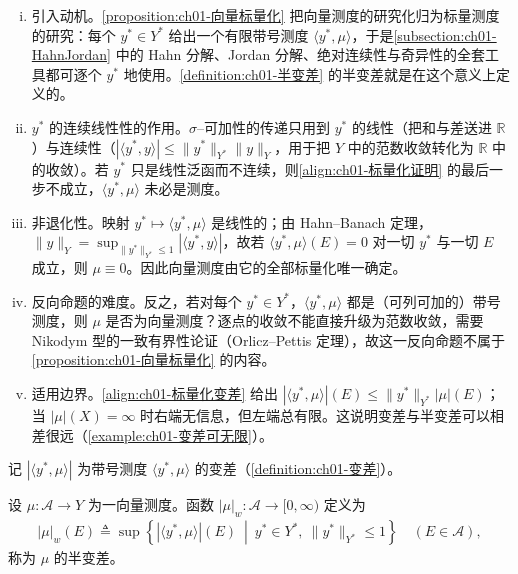\documentclass[../../main.tex]{subfiles}%
\begin{document}
\begin{remark}\label{remark:ch01-向量标量化注}
\begin{enumerate}[(i)]
\item 引入动机。\cref{proposition:ch01-向量标量化} 把向量测度的研究化归为标量测度的研究：每个 $y^*\in Y^*$ 给出一个有限带号测度 $\langle y^*,\mu\rangle$，于是\cref{subsection:ch01-HahnJordan} 中的 Hahn 分解、Jordan 分解、绝对连续性与奇异性的全套工具都可逐个 $y^*$ 地使用。\cref{definition:ch01-半变差} 的半变差就是在这个意义上定义的。
\item $y^*$ 的连续线性性的作用。$\sigma$--可加性的传递只用到 $y^*$ 的线性（把和与差送进 $\mathbb{R}$）与连续性（$\left|\langle y^*,y\rangle\right|\leqslant\|y^*\|_{Y^*}\|y\|_Y$，用于把 $Y$ 中的范数收敛转化为 $\mathbb{R}$ 中的收敛）。若 $y^*$ 只是线性泛函而不连续，则\eqref{align:ch01-标量化证明} 的最后一步不成立，$\langle y^*,\mu\rangle$ 未必是测度。
\item 非退化性。映射 $y^*\mapsto\langle y^*,\mu\rangle$ 是线性的；由 Hahn--Banach 定理，$\|y\|_Y=\sup_{\|y^*\|_{Y^*}\leqslant1}\left|\langle y^*,y\rangle\right|$，故若 $\langle y^*,\mu\rangle(E)=0$ 对一切 $y^*$ 与一切 $E$ 成立，则 $\mu\equiv0$。因此向量测度由它的全部标量化唯一确定。
\item 反向命题的难度。反之，若对每个 $y^*\in Y^*$，$\langle y^*,\mu\rangle$ 都是（可列可加的）带号测度，则 $\mu$ 是否为向量测度？逐点的收敛不能直接升级为范数收敛，需要 Nikodym 型的一致有界性论证（Orlicz--Pettis 定理），故这一反向命题不属于\cref{proposition:ch01-向量标量化} 的内容。
\item 适用边界。\eqref{align:ch01-标量化变差} 给出 $\left|\langle y^*,\mu\rangle\right|(E)\leqslant\|y^*\|_{Y^*}|\mu|(E)$；当 $|\mu|(X)=\infty$ 时右端无信息，但左端总有限。这说明变差与半变差可以相差很远（\cref{example:ch01-变差可无限}）。
\end{enumerate}
\end{remark}

记 $\left|\langle y^*,\mu\rangle\right|$ 为带号测度 $\langle y^*,\mu\rangle$ 的变差（\cref{definition:ch01-变差}）。

\begin{definition}\label{definition:ch01-半变差}
设 $\mu:\mathcal{A}\to Y$ 为一向量测度。函数 $|\mu|_w:\mathcal{A}\to[0,\infty)$ 定义为
\begin{align}
|\mu|_w(E)\triangleq\sup\left\{\left|\langle y^*,\mu\rangle\right|(E)\ \middle|\ y^*\in Y^*,\ \|y^*\|_{Y^*}\leqslant1\right\}\quad(E\in\mathcal{A}), \label{align:ch01-半变差}
\end{align}
称为 $\mu$ 的半变差。
\end{definition}
\end{document}
